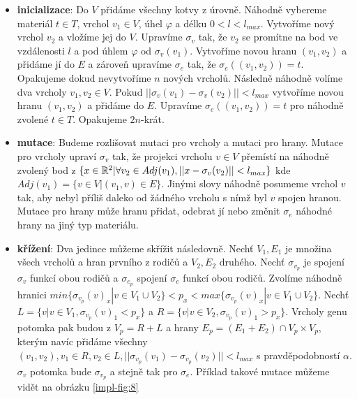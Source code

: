 \begin{itemize}
    \item \textbf{inicializace}: Do $V$ přidáme všechny kotvy z úrovně. Náhodně vybereme materiál $t \in T$, vrchol $v_1 \in V$, úhel $\varphi$ a délku $0 < l < l_{max}$. Vytvoříme nový vrchol $v_2$ a vložíme jej do $V$. Upravíme $\sigma_v$ tak, že $v_2$ se promítne na bod ve vzdálenosti $l$ a pod úhlem $\varphi$ od $\sigma_v(v_1)$. Vytvoříme novou hranu $(v_1, v_2)$ a přidáme jí do $E$ a zároveň upravíme $\sigma_e$ tak, že $\sigma_e((v_1, v_2)) = t$. Opakujeme dokud nevytvoříme $n$ nových vrcholů. Následně náhodně volíme dva vrcholy $v_1, v_2 \in V$. Pokud $||\sigma_v(v_1) - \sigma_v(v_2)|| < l_{max}$ vytvoříme novou hranu $(v_1, v_2)$ a přidáme do $E$. Upravíme $\sigma_e((v_1, v_2)) = t$ pro náhodně zvolené $t \in T$. Opakujeme $2n$-krát.
    \item \textbf{mutace}: Budeme rozlišovat mutaci pro vrcholy a mutaci pro hrany. Mutace pro vrcholy upraví $\sigma_v$ tak, že projekci vrcholu $v \in V$ přemístí na náhodně zvolený bod z $\{ x \in \mathbb{R}^2 | \forall v_2 \in Adj(v_1), ||x - \sigma_v(v_2)|| < l_{max}\}$ kde $Adj(v_1) = \{v \in V | (v_1, v) \in E\}$. Jinými slovy náhodně posumeme vrchol $v$ tak, aby nebyl příliš daleko od žádného vrcholu s nímž byl $v$ spojen hranou. Mutace pro hrany může hranu přidat, odebrat jí nebo změnit $\sigma_e$ náhodné hrany na jiný typ materiálu.
    \item \textbf{křížení}: Dva jedince můžeme skřížit následovně. Nechť $V_1, E_1$ je množina všech vrcholů a hran prvního z rodičů a $V_2, E_2$ druhého. Nechť $\sigma_{v_p}$ je spojení $\sigma_v$ funkcí obou rodičů a $\sigma_{e_p}$ spojení $\sigma_e$ funkcí obou rodičů. Zvolíme náhodně hranici $min\{\sigma_{v_p}(v)_x | v \in V_1 \cup V_2\} < p_x < max\{\sigma_{v_p}(v)_x | v \in V_1 \cup V_2\}$. Nechť $L = \{ v | v \in V_1, \sigma_{v_p}(v)_1 < p_x\}$ a $R = \{ v | v \in V_2, \sigma_{v_p}(v)_1 > p_x\}$. Vrcholy genu potomka pak budou z $V_p = R + L$ a hrany $E_p = (E_1 + E_2) \cap V_p \times V_p$, kterým navíc přidáme všechny $(v_1, v_2), v_1 \in R, v_2 \in L, ||\sigma_{v_p}(v_1) - \sigma_{v_p}(v_2)|| < l_{max}$ s pravděpodobností $\alpha$. $\sigma_v$ potomka bude $\sigma_{v_p}$ a stejně tak pro $\sigma_e$. Příklad takové mutace můžeme vidět na obrázku \ref{impl-fig:8}
\end{itemize}

